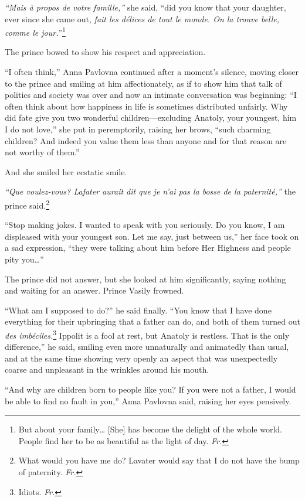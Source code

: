\textit{``Mais \`a propos de votre famille,''} she said, ``did you
know that your daughter, ever since she came out, \textit{fait les
  d\'elices de tout le monde. On la trouve belle, comme le
  jour.}''\footnote{But about your family\ldots{} [She] has become the
  delight of the whole world. People find her to be as beautiful as
  the light of day. \textit{Fr.}} %

The prince bowed to show his respect and appreciation.

``I often think,'' Anna Pavlovna continued after a moment's silence,
moving closer to the prince and smiling at him affectionately, as if
to show him that talk of politics and society was over and now an
intimate conversation was beginning: ``I often think about how
happiness in life is sometimes distributed unfairly. Why did fate give
you two wonderful children---excluding Anatoly, your youngest, him I do
not love,'' she put in peremptorily, raising her brows, ``such
charming children? And indeed you value them less than anyone and for
that reason are not worthy of them.'' %

And she smiled her ecstatic smile.

\textit{``Que voulez-vous? Lafater aurait dit que je n'ai pas la bosse
  de la paternit\'e,''} the prince said.\footnote{What would you have
  me do? Lavater would say that I do not have the bump of
  paternity. \textit{Fr.}} %

``Stop making jokes. I wanted to speak with you seriously. Do you
know, I am displeased with your youngest son. Let me say, just between
us,'' her face took on a sad expression, ``they were talking about him
before Her Highness and people pity you\ldots{}'' %

The prince did not answer, but she looked at him significantly, saying
nothing and waiting for an answer. Prince Vasily frowned.

``What am I supposed to do?'' he said finally. ``You know that I have
done everything for their upbringing that a father can do, and both of
them turned out \textit{des
  imb\'eciles.}\footnote{Idiots. \textit{Fr.}} Ippolit is a fool at
rest, but Anatoly is restless. That is the only difference,'' he said,
smiling even more unnaturally and animatedly than usual, and at the
same time showing very openly an aspect that was unexpectedly coarse
and unpleasant in the wrinkles around his mouth. %

``And why are children born to people like you? If you were not a
father, I would be able to find no fault in you,'' Anna Pavlovna said,
raising her eyes pensively. %

